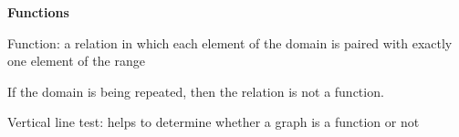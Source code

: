 \begin{center}
\textbf{Functions}
\end{center}

\vspace*{1ex}

Function: a relation in which each element of the domain is paired with exactly one element of the range
 
\vspce 

If the domain is being repeated, then the relation is not a function. 

\vspce 

Vertical line test: helps to determine whether a graph is a function or not
